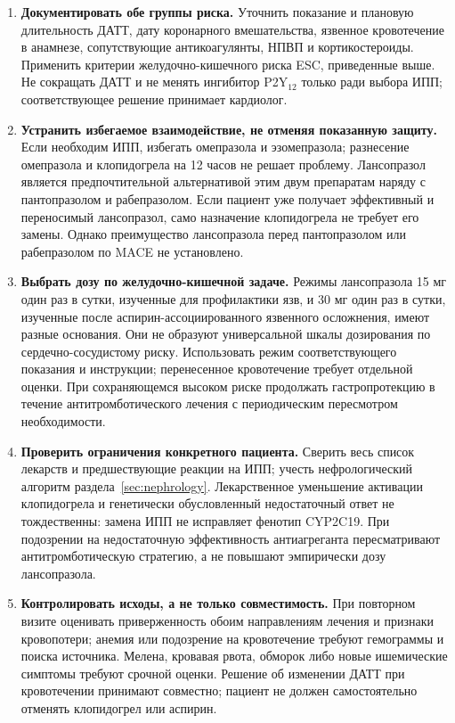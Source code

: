 \documentclass[11pt,a4paper,notitlepage]{report}
\newcommand{\src}[1]{\unskip\space\cite{#1}}
\begin{document}
\begin{enumerate}
\item \textbf{Документировать обе группы риска.} Уточнить показание и плановую длительность ДАТТ, дату коронарного вмешательства, язвенное кровотечение в анамнезе, сопутствующие антикоагулянты, НПВП и кортикостероиды. Применить критерии желудочно-кишечного риска ESC, приведенные выше. Не сокращать ДАТТ и не менять ингибитор P2Y$_{12}$ только ради выбора ИПП; соответствующее решение принимает кардиолог.\src{cardioesc2023,cardioacc2025}
\item \textbf{Устранить избегаемое взаимодействие, не отменяя показанную защиту.} Если необходим ИПП, избегать омепразола и эзомепразола; разнесение омепразола и клопидогрела на 12 часов не решает проблему. Лансопразол является предпочтительной альтернативой этим двум препаратам наряду с пантопразолом и рабепразолом. Если пациент уже получает эффективный и переносимый лансопразол, само назначение клопидогрела не требует его замены. Однако преимущество лансопразола перед пантопразолом или рабепразолом по MACE не установлено.\src{cardioplavix2025,sps}
\item \textbf{Выбрать дозу по желудочно-кишечной задаче.} Режимы лансопразола 15 мг один раз в сутки, изученные для профилактики язв, и 30 мг один раз в сутки, изученные после аспирин-ассоциированного язвенного осложнения, имеют разные основания. Они не образуют универсальной шкалы дозирования по сердечно-сосудистому риску. Использовать режим соответствующего показания и инструкции; перенесенное кровотечение требует отдельной оценки. При сохраняющемся высоком риске продолжать гастропротекцию в течение антитромботического лечения с периодическим пересмотром необходимости.\src{uslabel,aspirin15,aspirintrial,cardioesc2024}
\item \textbf{Проверить ограничения конкретного пациента.} Сверить весь список лекарств и предшествующие реакции на ИПП; учесть нефрологический алгоритм раздела~\ref{sec:nephrology}. Лекарственное уменьшение активации клопидогрела и генетически обусловленный недостаточный ответ не тождественны: замена ИПП не исправляет фенотип CYP2C19. При подозрении на недостаточную эффективность антиагреганта пересматривают антитромботическую стратегию, а не повышают эмпирически дозу лансопразола.\src{cardioplavix2025,uslabel}
\item \textbf{Контролировать исходы, а не только совместимость.} При повторном визите оценивать приверженность обоим направлениям лечения и признаки кровопотери; анемия или подозрение на кровотечение требуют гемограммы и поиска источника. Мелена, кровавая рвота, обморок либо новые ишемические симптомы требуют срочной оценки. Решение об изменении ДАТТ при кровотечении принимают совместно; пациент не должен самостоятельно отменять клопидогрел или аспирин.\src{cardioacc2025,cardioesc2024}
\end{enumerate}
\end{document}

